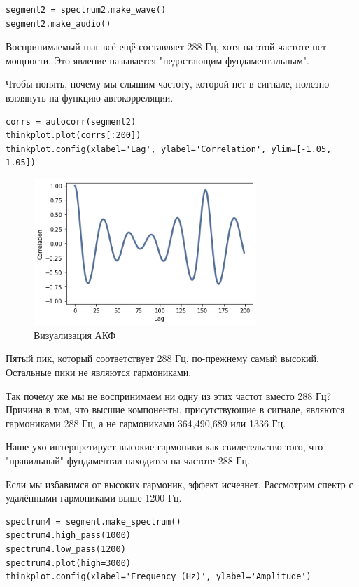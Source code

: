 \documentclass[a4paper,12pt]{report}
\begin{document}
\begin{lstlisting}[caption=Прослушивание сегмента]
segment2 = spectrum2.make_wave()
segment2.make_audio()
\end{lstlisting}

Воспринимаемый шаг всё ещё составляет 288 Гц, хотя на этой частоте нет мощности. Это явление называется "недостающим фундаментальным".

Чтобы понять, почему мы слышим частоту, которой нет в сигнале, полезно взглянуть на функцию автокорреляции.

\begin{lstlisting}[caption=Визуализация АКФ]
corrs = autocorr(segment2)
thinkplot.plot(corrs[:200])
thinkplot.config(xlabel='Lag', ylabel='Correlation', ylim=[-1.05, 1.05])
\end{lstlisting}

\begin{figure}[H]
        \centering
        \includegraphics[width=0.75\textwidth]{lab5_fig4_5.png}
        \caption{Визуализация АКФ}
        \label{fig:lab5_fig4_5}
\end{figure}

Пятый пик, который соответствует 288 Гц, по-прежнему самый высокий. Остальные пики не являются гармониками.

Так почему же мы не воспринимаем ни одну из этих частот вместо 288 Гц? Причина в том, что высшие компоненты, присутствующие в сигнале, являются гармониками 288 Гц, а не гармониками 364,490,689 или 1336 Гц.

Наше ухо интерпретирует высокие гармоники как свидетельство того, что "правильный" фундаментал находится на частоте 288 Гц.

Если мы избавимся от высоких гармоник, эффект исчезнет. Рассмотрим спектр с удалёнными гармониками выше 1200 Гц.

\begin{lstlisting}[caption=Спектр с удалёнными гармониками]
spectrum4 = segment.make_spectrum()
spectrum4.high_pass(1000)
spectrum4.low_pass(1200)
spectrum4.plot(high=3000)
thinkplot.config(xlabel='Frequency (Hz)', ylabel='Amplitude')
\end{lstlisting}
\end{document}
